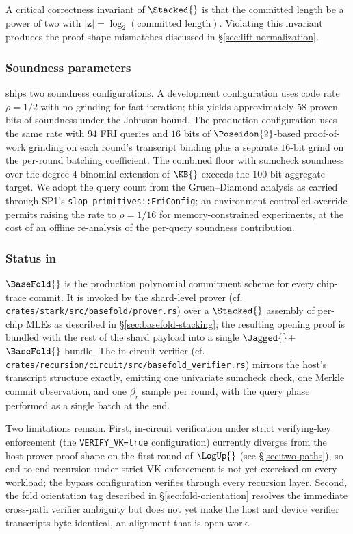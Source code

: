 A critical correctness invariant of $\Stacked{}$ is that the committed length be a power of two with $|\bm z| = \log_2(\text{committed length})$. Violating this invariant produces the proof-shape mismatches discussed in \S\ref{sec:lift-normalization}.

\subsubsection{Soundness parameters}

\Zirenver{} ships two soundness configurations. A development configuration uses code rate $\rho = 1/2$ with no grinding for fast iteration; this yields approximately $58$ proven bits of soundness under the Johnson bound. The production configuration uses the same rate with $94$ FRI queries and $16$ bits of $\Poseidon{2}$-based proof-of-work grinding on each round's transcript binding plus a separate $16$-bit grind on the per-round batching coefficient. The combined floor with sumcheck soundness over the degree-$4$ binomial extension of $\KB{}$ exceeds the $100$-bit aggregate target. We adopt the query count from the Gruen--Diamond analysis as carried through SP1's \texttt{slop\_primitives::FriConfig}; an environment-controlled override permits raising the rate to $\rho = 1/16$ for memory-constrained experiments, at the cost of an offline re-analysis of the per-query soundness contribution.

\subsubsection{Status in \Zirenver{}}

$\BaseFold{}$ is the production polynomial commitment scheme for every chip-trace commit. It is invoked by the shard-level prover (cf. \texttt{crates/stark/src/basefold/prover.rs}) over a $\Stacked{}$ assembly of per-chip MLEs as described in \S\ref{sec:basefold-stacking}; the resulting opening proof is bundled with the rest of the shard payload into a single $\Jagged{}$+$\BaseFold{}$ bundle. The in-circuit verifier (cf. \texttt{crates/recursion/circuit/src/basefold\_verifier.rs}) mirrors the host's transcript structure exactly, emitting one univariate sumcheck check, one Merkle commit observation, and one $\beta_r$ sample per round, with the query phase performed as a single batch at the end.

Two limitations remain. First, in-circuit verification under strict verifying-key enforcement (the \texttt{VERIFY\_VK=true} configuration) currently diverges from the host-prover proof shape on the first round of $\LogUp{}$ (see \S\ref{sec:two-paths}), so end-to-end recursion under strict VK enforcement is not yet exercised on every workload; the bypass configuration verifies through every recursion layer. Second, the fold orientation tag described in \S\ref{sec:fold-orientation} resolves the immediate cross-path verifier ambiguity but does not yet make the host and device verifier transcripts byte-identical, an alignment that is open work.

